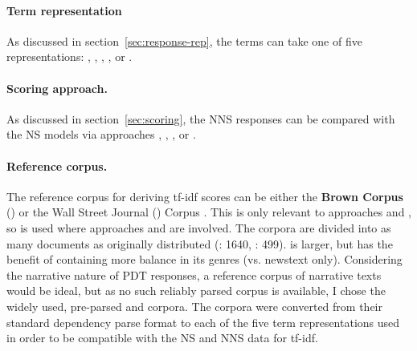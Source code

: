 \paragraph{Term representation} As discussed in
section~\ref{sec:response-rep}, the terms can take one of five
representations: , , , ,
or .

\paragraph{Scoring approach.} As discussed in
section~\ref{sec:scoring}, the NNS responses can be
compared with the NS models via approaches , , , or .

\paragraph{Reference corpus.} The reference corpus for deriving tf-idf
scores can be either the \textbf{Brown Corpus} () \citep{kucera:francis:67} or the
Wall Street Journal () Corpus \citep{marcus-et-al:93}. This is
only relevant to approaches  and
, so  is used where approaches  and  are involved. The corpora are divided into as many documents as
originally distributed (: 1640, : 499).  is
larger, but  has the benefit of containing more balance in its
genres (vs. newstext only). Considering the narrative nature of PDT
responses, a reference corpus of narrative texts would be ideal, but as no such reliably parsed corpus is available, I chose the widely used, pre-parsed  and  corpora. The corpora were converted from their standard dependency parse format to each of the five term representations used in order to be compatible with the NS and NNS data for tf-idf.

%
